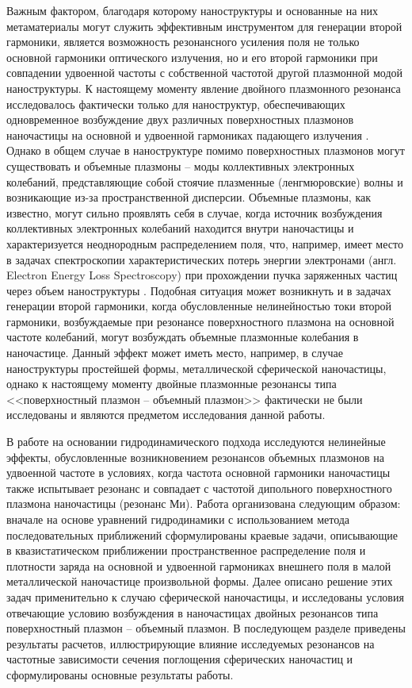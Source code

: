 \documentclass[12pt, a4paper]{article}
\begin{document}
Важным фактором, благодаря которому наноструктуры и основанные на них метаматериалы могут служить эффективным инструментом для генерации второй гармоники, является возможность резонансного усиления поля не только основной гармоники оптического излучения, но и его второй гармоники при совпадении удвоенной частоты с собственной частотой другой плазмонной модой наноструктуры. 
К настоящему моменту явление двойного плазмонного резонанса исследовалось фактически только для наноструктур, обеспечивающих одновременное возбуждение двух различных поверхностных плазмонов наночастицы на основной и удвоенной гармониках падающего излучения \cite{Ai2021,Thyagarajan2012}.
Однако в общем случае в наноструктуре помимо поверхностных плазмонов могут существовать и объемные плазмоны \cite{Elibol2022,Gildenburg2016,Ruppin1975,Gildenburg1965} -- моды коллективных электронных колебаний, представляющие собой стоячие плазменные (ленгмюровские) волны и возникающие из-за пространственной дисперсии. 
 Объемные плазмоны, как известно, могут сильно проявлять себя в случае, когда источник возбуждения коллективных электронных колебаний находится внутри наночастицы и характеризуется неоднородным распределением поля, что, например, имеет место в задачах спектроскопии характеристических потерь энергии электронами (англ. Electron Energy Loss Spectroscopy) при прохождении  пучка заряженных частиц через объем наноструктуры
\cite{Gildenburg2016, Kryshtal2025}. 
Подобная ситуация может возникнуть и в задачах генерации второй гармоники, когда обусловленные нелинейностью токи второй гармоники, возбуждаемые при резонансе поверхностного плазмона на основной частоте колебаний, могут возбуждать объемные плазмонные колебания в наночастице. Данный эффект может иметь место, например, в случае наноструктуры простейшей формы, металлической сферической наночастицы, однако к настоящему моменту двойные плазмонные резонансы типа <<поверхностный плазмон -- объемный плазмон>> фактически не были исследованы и являются предметом исследования данной работы.

В работе на основании гидродинамического подхода \cite{Haas2011, Boardman1982, Manfredi2021} исследуются нелинейные эффекты, обусловленные возникновением резонансов объемных плазмонов на удвоенной частоте в условиях, когда частота основной гармоники наночастицы также испытывает резонанс и совпадает с частотой дипольного поверхностного плазмона наночастицы (резонанс Ми). Работа организована следующим образом: вначале на основе уравнений гидродинамики с использованием метода последовательных приближений сформулированы краевые задачи, описывающие в квазистатическом приближении пространственное распределение поля и плотности заряда на основной и удвоенной гармониках внешнего поля в малой металлической наночастице произвольной формы. Далее описано решение этих задач применительно к случаю сферической наночастицы, и исследованы условия отвечающие условию возбуждения в наночастицах двойных резонансов типа поверхностный плазмон – объемный плазмон. В последующем разделе приведены результаты расчетов, иллюстрирующие влияние исследуемых резонансов на частотные зависимости сечения поглощения сферических наночастиц и сформулированы основные результаты работы.
\end{document}
